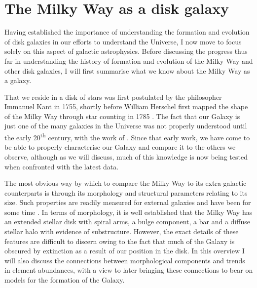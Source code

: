 \section{The Milky Way as a disk galaxy}


Having established the importance of understanding the formation and evolution of disk galaxies in our efforts to understand the Universe, I now move to focus solely on this aspect of galactic astrophysics. Before discussing the progress thus far in understanding the history of formation and evolution of the Milky Way and other disk galaxies, I will first summarise what we know about the Milky Way as a galaxy. 

That we reside in a disk of stars was first postulated by the philosopher Immanuel Kant in 1755, shortly before William Herschel first mapped the shape of the Milky Way through star counting in 1785 \citep{Herschel01011785}. The fact that our Galaxy is just one of the many galaxies in the Universe was not properly understood until the early 20\textsuperscript{th} century, with the work of \citet{1929ApJ....69..103H}. Since that early work, we have come to be able to properly characterise our Galaxy and compare it to the others we observe, although as we will discuss, much of this knowledge is now being tested when confronted with the latest data.

The most obvious way by which to compare the Milky Way to its extra-galactic counterparts is through its morphology and structural parameters relating to its size. Such properties are readily measured for external galaxies and have been for some time \citep[e.g.][]{1959HDP....53..311D}. In terms of morphology, it is well established that the Milky Way has an extended stellar disk with spiral arms, a bulge component, a bar and a diffuse stellar halo with evidence of substructure. However, the exact details of these features are difficult to discern owing to the fact that much of the Galaxy is obscured by extinction as a result of our position in the disk. In this overview I will also discuss the connections between morphological components and trends in element abundances, with a view to later bringing these connections to bear on models for the formation of the Galaxy.

